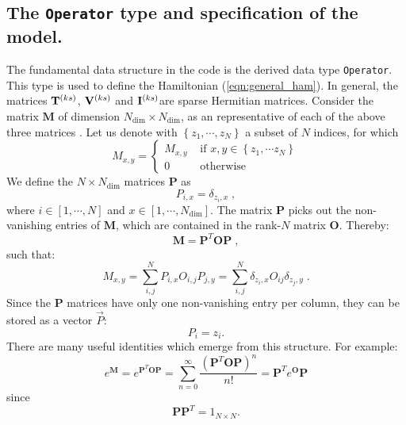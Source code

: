 \subsection{The \texttt{Operator} type and specification of the model.}
The fundamental data structure in the code is the derived data type \texttt{Operator}. This type is used to define the Hamiltonian (\ref{eqn:general_ham}). 
In general, the matrices ${\bf T}^{(ks)}$, ${\bf V}^{(ks)}$  and   ${\bf I}^{(ks)}$are sparse Hermitian matrices.   
Consider the  matrix   ${\bm M}$ of dimension  $N_{\mathrm{dim}} \times N_{\mathrm{dim}}$, as an representative of each of the above three matrices .  Let us  denote  with  $ \left\{z_{1},\cdots,  z_{N}  \right\}$  a subset  of $N$ indices,  
for which
\begin{equation}
M_{x,y}  =
\left\{\begin{matrix}  M_{x,y}  &  \text{ if }   x,  y  \in \left\{ z_1, \cdots z_N \right\}\\ 
                                  0         &  \text{ otherwise } 
      \end{matrix}\right.
\end{equation}
 We define the $N \times N_{\mathrm{dim}}$ matrices $\mathbf{P}$  as
\begin{equation}
P_{i,x}=\delta_{z_{i},x}\;,
\end{equation}
where $i \in [1,\cdots, N ]$ and $ x  \in [1,\cdots, N_{\mathrm{dim}}]$. The matrix  $\bm{P}$ picks out the non-vanishing entries of $\bm{M}$, 
which are contained in the rank-$N$  matrix $\bm{O}$.  Thereby: 
\begin{equation}
\bm{M} =\bm{P}^{T} \bm{O} \bm{P}\;,
\end{equation}
such that:
\begin{equation}
M_{x,y} = \sum\limits_{i,j}^{N}  P_{i,x}  O_{i,j} P_{j,y}=\sum\limits_{i,j}^{N} \delta_{z_{i},x}  O_{ij} \delta_{z_{j},y} \;.
\end{equation}
Since  the  $\bm{P}$ matrices have only one non-vanishing entry per column,  they can be stored as a vector $\vec{P}$:
\begin{equation}
     P_i = z_i.
\end{equation}  
There are  many useful  identities which emerge from this  structure. For example: 
\begin{equation}
	e^{\bm{M}} =  e^{\bm{P}^{T} \bm{O} \bm{P}}   = \sum_{n=0}^{\infty}  \frac{\left( \bm{P}^{T} \bm{O} \bm{P} \right)^n}{n!} =  \bm{P}^{T} e^{ \bm{O} } \bm{P}
\end{equation}
since 
\begin{equation} 
	 \bm{P} \bm{P}^{T}= 1_{N\times N}.
\end{equation}

